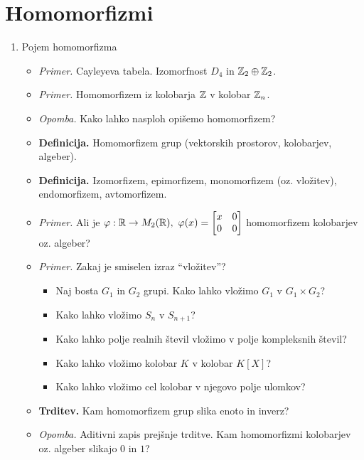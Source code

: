 \section{Homomorfizmi}

\begin{enumerate}
    \item Pojem homomorfizma
    \begin{itemize}
        \item \colorbox{yellow!30}{\emph{Primer.}} Cayleyeva tabela. Izomorfnost $D_4$ in $\mathbb{Z}_2 \oplus \mathbb{Z}_2$.
        \item \colorbox{yellow!30}{\emph{Primer.}} Homomorfizem iz kolobarja $\mathbb{Z}$ v kolobar $\mathbb{Z}_n$.
        \item \colorbox{yellow!30}{\emph{Opomba.}} Kako lahko nasploh opišemo homomorfizem?
        \item \colorbox{purple!30}{\textbf{Definicija.}} Homomorfizem grup (vektorskih prostorov, kolobarjev, algeber).
        \item \colorbox{purple!30}{\textbf{Definicija.}} Izomorfizem, epimorfizem, monomorfizem (oz. vložitev), endomorfizem, avtomorfizem.
        \item \colorbox{yellow!30}{\emph{Primer.}} Ali je $\varphi: \mathbb{R} \to M_2(\mathbb{R}), \ \varphi(x) = \begin{bmatrix}
            x & 0 \\ 0 & 0
        \end{bmatrix}$ homomorfizem kolobarjev oz. algeber?
        \item \colorbox{yellow!30}{\emph{Primer.}} Zakaj je smiselen izraz "`vložitev"'?
        \begin{itemize}
            \item Naj bosta $G_1$ in $G_2$ grupi. Kako lahko vložimo $G_1$ v $G_1 \times G_2$?
            \item Kako lahko vložimo $S_n$ v $S_{n+1}$?
            \item Kako lahko polje realnih števil vložimo v polje kompleksnih števil?
            \item Kako lahko vložimo kolobar $K$ v kolobar $K[X]$?
            \item Kako lahko vložimo cel kolobar v njegovo polje ulomkov?
        \end{itemize}
        \item \colorbox{blue!30}{\textbf{Trditev.}} Kam homomorfizem grup slika enoto in inverz? 
        \item \colorbox{yellow!30}{\emph{Opomba.}} Aditivni zapis prejšnje trditve. Kam homomorfizmi kolobarjev oz. algeber slikajo $0$ in $1$?

\end{itemize}
\end{enumerate}
